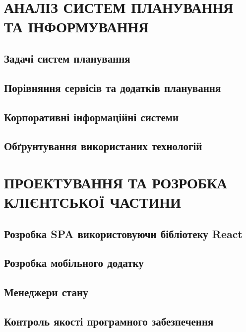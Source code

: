 \documentclass[a4paper,14pt]{extarticle} %
\begin{document}


\tableofcontents %
\clearpage


\section{АНАЛІЗ СИСТЕМ ПЛАНУВАННЯ ТА ІНФОРМУВАННЯ}

\subsection{Задачі систем планування} 

\subsection{Порівняння сервісів та додатків планування} 



\subsection{Корпоративні інформаційні системи} 

\subsection{Обґрунтування використаних технологій} 


\clearpage
\section{ПРОЕКТУВАННЯ ТА РОЗРОБКА КЛІЄНТСЬКОЇ ЧАСТИНИ}

\subsection{Розробка SPA використовуючи бібліотеку React}





\subsection{Розробка мобільного додатку}


\subsection{Менеджери стану}


\subsection{Контроль якості програмного забезпечення}


\end{document}
